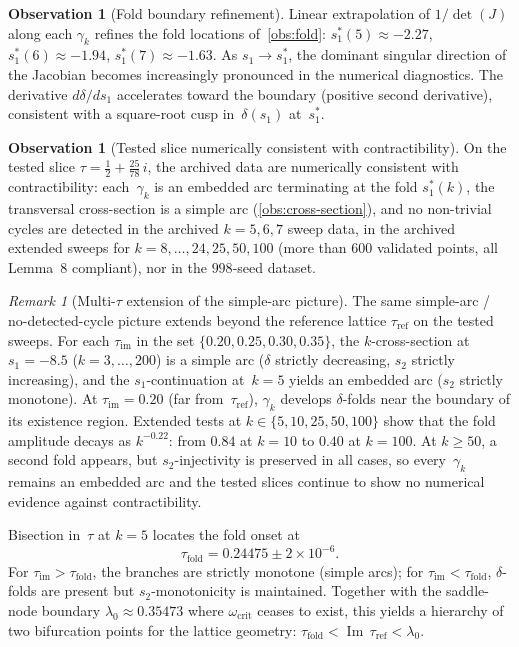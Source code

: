 \documentclass[11pt,a4paper]{article}
\theoremstyle{plain}
\theoremstyle{definition}
\newtheorem{observation}[theorem]{Observation}
\theoremstyle{remark}
\newtheorem{remark}[theorem]{Remark}
\DeclareMathOperator{\Imag}{Im}
\begin{document}
\begin{observation}[Fold boundary refinement]
\label{obs:fold-refined}
Linear extrapolation of $1/\det(J)$ along each
$\gamma_k$ refines the fold locations
of~\cref{obs:fold}:
$s_1^*(5) \approx -2.27$,
$s_1^*(6) \approx -1.94$,
$s_1^*(7) \approx -1.63$.
As $s_1 \to s_1^*$, the dominant singular direction of the Jacobian
becomes increasingly pronounced in the numerical diagnostics.
The derivative $d\delta/ds_1$ accelerates toward the boundary
(positive second derivative), consistent with a
square-root cusp in~$\delta(s_1)$ at~$s_1^*$.
\end{observation}

\begin{observation}[Tested slice numerically consistent with
  contractibility]
\label{obs:contractible}
On the tested slice
$\tau = \tfrac12 + \tfrac{25}{78}\,i$, the archived data are
numerically consistent with contractibility:
each~$\gamma_k$ is an embedded arc terminating at the fold
$s_1^*(k)$, the transversal cross-section is a simple arc
(\cref{obs:cross-section}), and no non-trivial cycles are
detected in the archived $k=5,6,7$ sweep data, in the
archived extended sweeps for $k = 8,\ldots,24,25,50,100$
(more than $600$ validated points, all Lemma~8 compliant), nor in the
$998$-seed dataset.
\end{observation}

\begin{remark}[Multi-$\tau$ extension of the simple-arc picture]
\label{rem:multi-tau-contractibility}
The same simple-arc / no-detected-cycle picture extends beyond the
reference lattice $\tau_{\mathrm{ref}}$ on the tested sweeps.
For each $\tau_{\mathrm{im}}$ in the set
$\{0.20, 0.25, 0.30, 0.35\}$,
the $k$-cross-section at $s_1 = -8.5$
($k = 3, \ldots, 200$) is a simple arc
($\delta$ strictly decreasing, $s_2$ strictly increasing),
and the $s_1$-continuation at~$k=5$ yields an embedded arc
($s_2$ strictly monotone).
At $\tau_{\mathrm{im}} = 0.20$ (far from~$\tau_{\mathrm{ref}}$),
$\gamma_{k}$ develops $\delta$-folds near the boundary of its
existence region.  Extended tests at
$k \in \{5, 10, 25, 50, 100\}$ show that the fold amplitude
decays as $k^{-0.22}$: from $0.84$ at $k=10$ to $0.40$ at
$k=100$.  At $k \geq 50$, a second fold appears, but
$s_2$-injectivity is preserved in all cases, so
every~$\gamma_k$ remains an embedded arc and the tested slices continue
to show no numerical evidence against contractibility.

Bisection in~$\tau$ at $k = 5$ locates the fold onset at
\[
  \tau_{\mathrm{fold}} = 0.24475 \pm 2 \times 10^{-6}.
\]
For $\tau_{\mathrm{im}} > \tau_{\mathrm{fold}}$,
the branches are strictly monotone (simple arcs); for
$\tau_{\mathrm{im}} < \tau_{\mathrm{fold}}$,
$\delta$-folds are present but $s_2$-monotonicity is
maintained.
Together with the saddle-node boundary
$\lambda_0 \approx 0.35473$ where
$\omega_{\mathrm{crit}}$ ceases to exist, this yields a
hierarchy of two bifurcation points for the lattice
geometry:
$\tau_{\mathrm{fold}} < \Imag\,\tau_{\mathrm{ref}} < \lambda_0$.
\end{remark}
\end{document}
